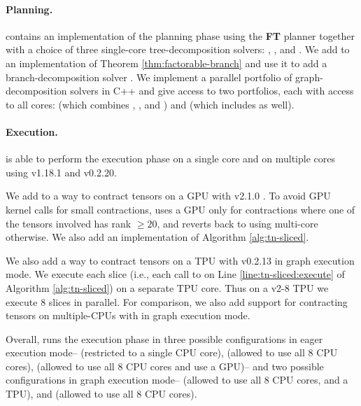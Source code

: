 \paragraph{Planning.} 
 contains an implementation of the planning phase using the \textbf{FT} planner together with a choice of three single-core tree-decomposition solvers:  \cite{Tamaki17},  \cite{HS18}, and  \cite{AMW17}. We add to  an implementation of Theorem \ref{thm:factorable-branch} and use it to add a branch-decomposition solver  \cite{hicks02}.
We implement a parallel portfolio of graph-decomposition solvers in C++ and give  access to two portfolios, each with access to all cores:  (which combines ,  , and ) and  (which includes  as well).

\paragraph{Execution.} 
 is able to perform the execution phase on a single core and on multiple cores using  v1.18.1 and  v0.2.20. 

We add to  a way to contract tensors on a GPU with  v2.1.0 \cite{ABCCDDDGII16}. To avoid GPU kernel calls for small contractions,  uses a GPU only for contractions where one of the tensors involved has rank $\geq 20$, and reverts back to using multi-core  otherwise. We also add an implementation of Algorithm \ref{alg:tn-sliced}.

We also add a way to contract tensors on a TPU with  v0.2.13 \cite{jax2018github} in graph execution mode. 
We execute each slice (i.e., each call to  on Line \ref{line:tn-sliced:execute} of Algorithm \ref{alg:tn-sliced}) on a separate TPU core. 
Thus on a v2-8 TPU we execute 8 slices in parallel. 
For comparison, we also add support for contracting tensors on multiple-CPUs with  in graph execution mode.

Overall,  runs the execution phase in three possible configurations in eager execution mode--  (restricted to a single CPU core),  (allowed to use all 8 CPU cores),  (allowed to use all 8 CPU cores and use a GPU)-- and two possible configurations in graph execution mode--  (allowed to use all 8 CPU cores, and a TPU), and  (allowed to use all 8 CPU cores).

